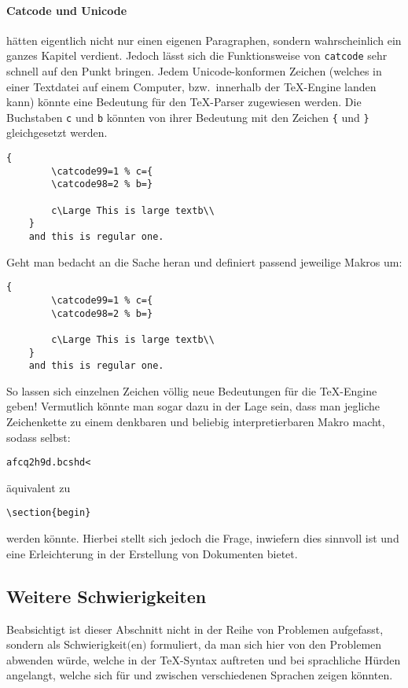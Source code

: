 \paragraph*{Catcode und Unicode}\label{par:catcode} hätten eigentlich nicht nur einen eigenen Paragraphen, sondern wahrscheinlich ein ganzes Kapitel verdient. Jedoch lässt sich die Funktionsweise von \texttt{catcode} sehr schnell auf den Punkt bringen. Jedem Unicode-konformen Zeichen (welches in einer Textdatei auf einem Computer, bzw.\ innerhalb der \TeX{}-Engine landen kann) könnte eine Bedeutung für den \TeX{}-Parser zugewiesen werden. Die Buchstaben \texttt{c} und \texttt{b} könnten von ihrer Bedeutung mit den Zeichen \verb|{| und \verb|}| gleichgesetzt werden. 
\begin{Verbatim}[breaklines=true, breakanywhere=true]
    {
        \catcode99=1 % c={
        \catcode98=2 % b=}
    
        c\Large This is large textb\\
    }
    and this is regular one.
\end{Verbatim}
Geht man bedacht an die Sache heran und definiert passend jeweilige Makros um:
\begin{Verbatim}[breaklines=true, breakanywhere=true]
    {
        \catcode99=1 % c={
        \catcode98=2 % b=}
    
        c\Large This is large textb\\
    }
    and this is regular one.
\end{Verbatim}
So lassen sich einzelnen Zeichen völlig neue Bedeutungen für die \TeX{}-Engine geben! Vermutlich könnte man sogar dazu in der Lage sein, dass man jegliche Zeichenkette zu einem denkbaren und beliebig interpretierbaren Makro macht, sodass selbst:
\begin{Verbatim}[breaklines=true, breakanywhere=true]
    afcq2h9d.bcshd<
\end{Verbatim} 
äquivalent zu 
\begin{Verbatim}[breaklines=true, breakanywhere=true]
    \section{begin}
\end{Verbatim} 
werden könnte. Hierbei stellt sich jedoch die Frage, inwiefern dies sinnvoll ist und eine Erleichterung in der Erstellung von Dokumenten bietet.

\subsection{Weitere Schwierigkeiten}\label{subsec:weitereschwierigkeiten}
Beabsichtigt ist dieser Abschnitt nicht in der Reihe von Problemen aufgefasst, sondern als Schwierigkeit$($en$)$ formuliert, da man sich hier von den Problemen abwenden würde, welche in der \TeX{}-Syntax auftreten und bei sprachliche Hürden angelangt, welche sich für und zwischen verschiedenen Sprachen zeigen könnten.

